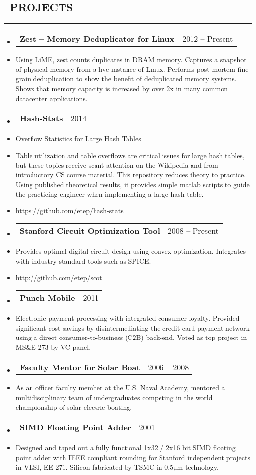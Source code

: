 \documentclass[10pt,letterpaper]{article}
\makeatletter
\newenvironment{resumesection}[1]
{%
    \subsection*{\ \textcolor{light-gray}{#1} }
    \vspace{-0.4em}
    \begin{samepage}
    \hrule
    \end{samepage}
    \vspace{+0.4em}
    \begin{itemize}[leftmargin=0.15cm]
        \parskip=0.1em
}%
{%
    \end{itemize}
}%
\newcommand{\myitem}[1]
{\item[] \textcolor{dark-gray}{#1} }
\newcommand{\headerrowx}[2]
{\item[] \begin{tabular*}{\linewidth}{l@{\extracolsep{\fill}}r}
	#1 &
	#2 \\
\end{tabular*}}
\newcommand{\rminiw}{0.550}
\makeatother
\begin{document}
\begin{minipage}[t]{\rminiw\textwidth}
\begin{resumesection}{PROJECTS}
    \headerrowx{ \textbf{Zest -- Memory Deduplicator for Linux}} {2012 -- Present}
    \myitem{Using LiME, zest counts duplicates in DRAM memory.
            Captures a snapshot of physical memory from a live instance of Linux.
            Performs post-mortem fine-grain deduplication to show the benefit of deduplicated memory systems.
            Shows that memory capacity is increased by over 2x in many common datacenter applications.}
    \headerrowx{ \textbf{Hash-Stats}} {2014}
    \myitem{Overflow Statistics for Large Hash Tables}
    \myitem{Table utilization and table overflows are critical issues for large hash tables,
            but these topics receive scant attention on the Wikipedia and from introductory CS course material.
            This repository reduces theory to practice.
            Using published theoretical results, it provides simple matlab scripts to guide the practicing engineer when implementing a large hash table.}
    \myitem{https://github.com/etep/hash-stats}
    \headerrowx{ \textbf{Stanford Circuit Optimization Tool}} {2008 -- Present}
    \myitem{Provides optimal digital circuit design using convex optimization.
            Integrates with industry standard tools such as SPICE.}
    \myitem{http://github.com/etep/scot}
    \headerrowx{ \textbf{Punch Mobile}} {2011}
    \myitem{Electronic payment processing with integrated consumer loyalty.
            Provided significant cost savings by disintermediating the credit card payment network using a direct consumer-to-business (C2B) back-end.
            Voted as top project in MS\&E-273 by VC panel.}
    \headerrowx{ \textbf{Faculty Mentor for Solar Boat}} {2006 -- 2008}
    \myitem{As an officer faculty member at the U.S. Naval Academy,
            mentored a multidisciplinary team of undergraduates
            competing in the world championship of solar electric boating.}
    \headerrowx{ \textbf{SIMD Floating Point Adder}} {2001}
    \myitem{Designed and taped out a fully functional 1x32 / 2x16 bit
            SIMD floating point adder with IEEE compliant rounding
            for Stanford independent projects in VLSI, EE-271.
            Silicon fabricated by TSMC in 0.5$\mathrm{ \mu m}$ technology.}
\end{resumesection}
\end{minipage}
\end{document}
